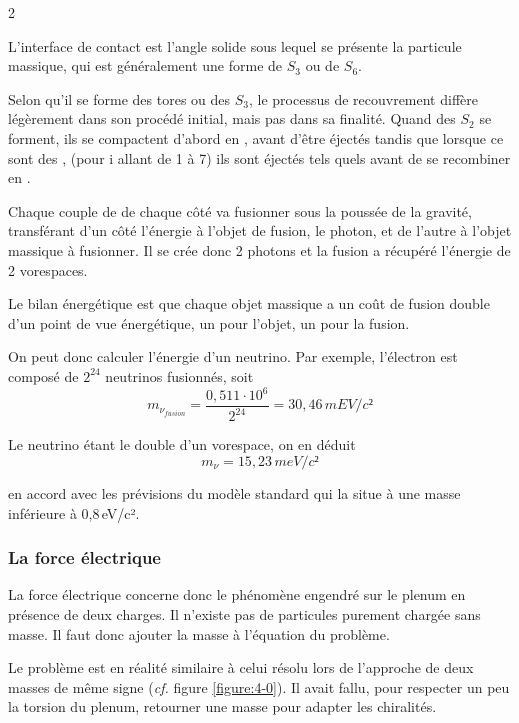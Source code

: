 \begin{multicols}{2}

L'interface de contact est l'angle solide sous lequel se présente la
particule massique, qui est généralement une forme de $S_3$ ou de $S_6$.

Selon qu'il se forme des tores ou des $S_3$, le processus de
recouvrement diffère légèrement dans son procédé initial, mais pas
dans sa finalité. Quand des $S_2$ se forment, ils se compactent
d'abord en , avant d'être éjectés tandis que lorsque ce sont
des , (pour i allant de 1 à 7) ils sont éjectés tels quels avant de se recombiner en
.

Chaque couple de  de chaque côté va fusionner sous la poussée
de la gravité, transférant d'un côté l'énergie à l'objet de fusion, le
photon, et de l'autre à l'objet massique à fusionner. Il se crée donc
2 photons et la fusion a récupéré l'énergie de 2 vorespaces.

Le bilan énergétique est que chaque objet massique a un coût de
fusion double d'un point de vue énergétique, un pour l'objet, un pour la
fusion.

On peut donc calculer l'énergie d'un neutrino. Par exemple, l'électron
est composé de $2^{24}$ neutrinos fusionnés, soit
\begin{equation*}
m_{\nu_{fusion}} = \frac {0,511 \cdot 10^6} {2^{24}} = 30,46\,mEV/c²
\end{equation*}

Le neutrino étant le double d'un vorespace, on en déduit
\begin{equation*}
m_{\nu} = 15,23\,meV/c²
\end{equation*}

en accord avec les prévisions du modèle standard qui la situe à une masse inférieure à 0,8\,eV/c².

\subsubsection{La force électrique}

La force électrique concerne donc le phénomène engendré sur le plenum
en présence de deux charges. Il n'existe pas de particules purement
chargée sans masse. Il faut donc ajouter la masse à l'équation du
problème.

Le problème est en réalité similaire à celui résolu lors de l'approche
de deux masses de même signe (\textit{cf.} figure \ref{figure:4-0}). Il avait fallu, pour respecter un peu la
torsion du plenum, retourner une masse pour adapter les chiralités.


\end{multicols}
